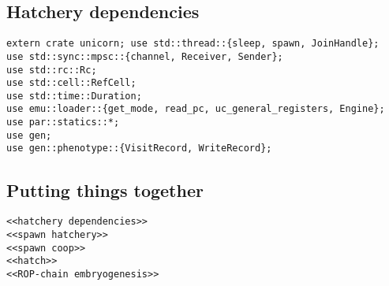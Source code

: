 \documentclass[11pt]{article}
\begin{document}
\subsection{Hatchery dependencies}
\label{sec:orgc4228f6}
\lstset{language=rust,label=org7ff0a83,caption= ,captionpos=b,numbers=none}
\begin{lstlisting}
extern crate unicorn; use std::thread::{sleep, spawn, JoinHandle}; 
use std::sync::mpsc::{channel, Receiver, Sender};
use std::rc::Rc;
use std::cell::RefCell;
use std::time::Duration;
use emu::loader::{get_mode, read_pc, uc_general_registers, Engine};
use par::statics::*;
use gen;
use gen::phenotype::{VisitRecord, WriteRecord};
\end{lstlisting}


\subsection{Putting things together}
\label{sec:org76650f9}
\lstset{language=rust,label=org80b2ba2,caption= ,captionpos=b,numbers=none}
\begin{lstlisting}
<<hatchery dependencies>>
<<spawn hatchery>>
<<spawn coop>>
<<hatch>>
<<ROP-chain embryogenesis>>
\end{lstlisting}
\end{document}
